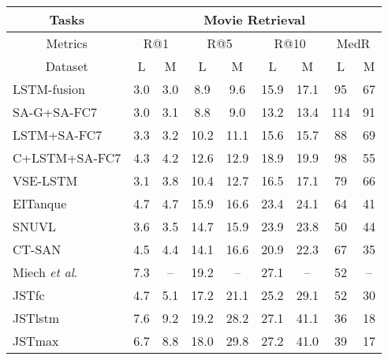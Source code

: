 \documentclass[runningheads]{llncs}
\makeatletter
\DeclareRobustCommand\onedot{\futurelet\@let@token\@onedot}
\def\onedot{.\@\xspace}
\def\etal{\textit{et al}\onedot}
\makeatother
\begin{document}
\begin{table*}[tb]
\setlength\tabcolsep{6pt} \centering
\small
\newcommand{\ranked}[1]{\xspace\scriptsize\sf{(#1)}}
\begin{tabular}{|l|cc|cc|cc|cc|}
\hline
\multicolumn{1}{|c|}{Tasks }           & \multicolumn{8}{c|}{\footnotesize Movie Retrieval} \\ \hline
\multicolumn{1}{|c|}{Metrics}           & \multicolumn{2}{c|}{\footnotesize R@1}      & \multicolumn{2}{c|}{\footnotesize R@5 } &  \multicolumn{2}{c|}{\footnotesize R@10 } & \multicolumn{2}{c|}{\footnotesize MedR } \\ \hline
\multicolumn{1}{|c|}{Dataset }           & L     & M         & L      & M        & L      & M        & L     & M         \\ \hline
LSTM-fusion                                 & 3.0   & 3.0       & 8.9    & 9.6      & 15.9   & 17.1     & 95    & 67       \\ 
SA-G+SA-FC7 \cite{torabi-arxiv-2016}        & 3.0   & 3.1       & 8.8    & 9.0      & 13.2   & 13.4     & 114   & 91       \\
LSTM+SA-FC7 \cite{torabi-arxiv-2016}    & 3.3   & 3.2       & 10.2   & 11.1     & 15.6   & 15.7     & 88    & 69        \\
C+LSTM+SA-FC7 \cite{torabi-arxiv-2016} & 4.3   & 4.2       & 12.6   & 12.9     & 18.9   & 19.9     & 98    & 55        \\
VSE-LSTM \cite{kiros-tacl-2014}        & 3.1   & 3.8        & 10.4    & 12.7    & 16.5   & 17.1      & 79    & 66         \\
EITanque \cite{kaufman-iccv-2017}      & 4.7   & 4.7       & 15.9   & 16.6     & 23.4   & 24.1     & 64    & 41        \\
SNUVL  \cite{yu-arxiv-2016}            & 3.6   & 3.5       & 14.7   & 15.9     & 23.9   & 23.8     & 50    & 44        \\ 
CT-SAN           \cite{yu-cvpr-2017}   & 4.5   & 4.4       & 14.1   & 16.6     & 20.9   & 22.3     & 67    & 35        \\ Miech \etal \cite{miech-iccv-2017}     & 7.3   & --        & 19.2   & --       & 27.1   & --       & 52    & --        \\  \hline
JSTfc					   & 4.7   & 5.1       & 17.2   & 21.1     & 25.2   & 29.1     & 52    & 30        \\  
JSTlstm						   & 7.6   & 9.2       & 19.2    & 28.2    & 27.1   & 41.1     & 36    & 18        \\  
JSTmax                                 & 6.7   & 8.8       & 18.0     & 29.8   & 27.2   & 41.0     & 39    & 17        \\ 

\end{tabular}
\end{table*}
\end{document}
